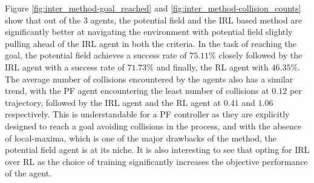 Figure \ref{fig:inter_method-goal_reached} and \ref{fig:inter_method-collision_counts} show that out of the 3 agents, the potential field and the IRL based method are significantly better at navigating the environment with potential field slightly pulling ahead of the IRL agent in both the criteria. In the task of reaching the goal, the potential field achieves a success rate of $75.11\%$ closely followed by the IRL agent with a success rate of  $71.73\%$ and finally, the RL agent with $46.35\%$. The average number of collisions encountered by the agents also has a similar trend, with the PF agent encountering the least number of collisions at $0.12$ per trajectory, followed by the IRL agent and the RL agent at $0.41$ and $1.06$ respectively. This is understandable for a PF controller as they are explicitly designed to reach a goal avoiding collisions in the process, and with the absence of local-maxima, which is one of the major drawbacks of the method, the potential field agent is at its niche. It is also interesting to see that opting for IRL over RL as the choice of training significantly increases the objective performance of the agent.


